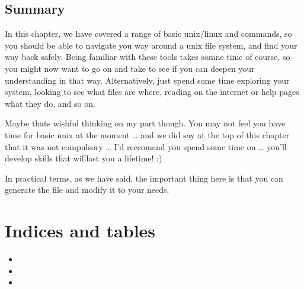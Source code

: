 \documentclass[letterpaper,10pt,english]{sphinxmanual}
\begin{document}
\section{Summary}
\label{\detokenize{Appendix1:Summary}}
In this chapter, we have covered a range of basic unix/linux and  commands, so you should be able to navigate you way around a unix file system, and find your way back safely. Being familiar with these tools takes somne time of course, so you might now want to go on and take  to see if you can deepen your understanding in that way. Alternatively, just spend some time exploring your system, looking to see
what files are where, reading on the internet or help pages what they do, and so on.

Maybe thats wishful thinking on my part though. You may not feel you have time for basic unix at the moment … and we did say at the top of this chapter that it was not compulsory … I’d reccomend you  spend some time on  … you’ll develop skills that willlast you a lifetime! ;\sphinxhyphen{})

In practical terms, as we have said, the important thing here is that you can generate the file  and modify it to your needs.


\chapter{Indices and tables}
\label{\detokenize{index:indices-and-tables}}\begin{itemize}
\item {} 

\item {} 

\item {} 

\end{itemize}



\renewcommand{\indexname}{Index}
\printindex
\end{document}
